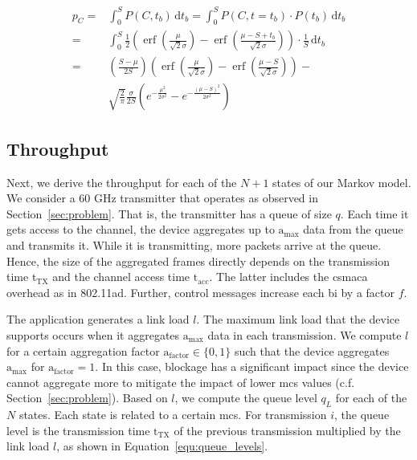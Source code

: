 \documentclass{article}
\DeclareMathOperator\erf{erf}
\begin{document}
\vspace{-4mm}
\begin{equation}
\begin{aligned}	
p_C 	= &\int_0^{S} P(C, t_b)\, \mathrm{d}t_b = \int_0^{S} P(C, t = t_b) \cdot P(t_b)\, \mathrm{d}t_b \\[1mm]
		   	= &\int_0^{S} \frac{1}{2} \left( \erf{\left( \frac{\mu}{\sqrt{2}\sigma} \right)} - \erf{\left( \frac{\mu-S+t_b}{\sqrt{2}\sigma} \right)} \right) \cdot \frac{1}{S}\, \mathrm{d}t_b \\[3mm]
= &\left( \frac{S-\mu}{2S} \right) \left( \erf{\left( \frac{\mu}{\sqrt{2}\sigma} \right)} - \erf{\left( \frac{\mu - S}{\sqrt{2}\sigma} \right)} \right) - \\[1mm]
		   	& \sqrt{\frac{2}{\pi}} \frac{\sigma}{2S} \left( e^{-\frac{\mu^2}{2\sigma^2}} - e^{-\frac{\left(\mu - S\right)^2}{2\sigma^2}} \right)
\label{equ:final_pc_int}
\end{aligned}
\end{equation}
\vspace{-4mm}



\subsection{Throughput}

Next, we derive the throughput for each of the $N+1$ states of our Markov model. We consider a 60 GHz transmitter that operates as observed in Section~\ref{sec:problem}. That is, the transmitter has a queue of size $q$. Each time it gets access to the channel, the device aggregates up to $\text{a}_\text{max}$ data from the queue and transmits it. While it is transmitting, more packets arrive at the queue. Hence, the size of the aggregated frames directly depends on the transmission time $\text{t}_\text{TX}$ and the channel access time $\text{t}_\text{acc}$. The latter includes the \ac{csmaca} overhead as in 802.11ad. Further, control messages increase each \ac{bi} by a factor $f$.

The application generates a link load $l$. The maximum link load that the device supports occurs when it aggregates $\text{a}_\text{max}$ data in each transmission. We compute $l$ for a certain aggregation factor $\text{a}_\text{factor} \in \{0, 1\}$ such that the device aggregates $\text{a}_\text{max}$ for $\text{a}_\text{factor} = 1$. In this case, blockage has a significant impact since the device cannot aggregate more to mitigate the impact of lower \ac{mcs} values (c.f. Section~\ref{sec:problem}). Based on $l$, we compute the queue level $q_L$ for each of the $N$ states. Each state is related to a certain \ac{mcs}. For transmission $i$, the queue level is the transmission time $\text{t}_\text{TX}$ of the previous transmission multiplied by the link load $l$, as shown in Equation~\ref{equ:queue_levels}.
\end{document}
